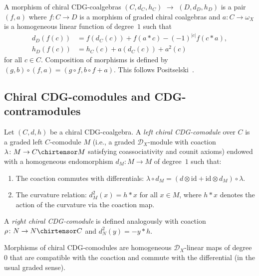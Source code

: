 \begin{remark}
\label{rem:CDG-morphisms}
A morphism of chiral CDG-coalgebras $(C, d_C, h_C)$
$\to$ $(D, d_D, h_D)$ is a pair $(f, a)$ where
$f\colon C \to D$ is a morphism of graded chiral
coalgebras and $a\colon C \to \omega_X$
is a homogeneous linear function of degree~$1$ such
that
\begin{align*}
d_D(f(c)) &= f(d_C(c)) + f(a \ast c) - (-1)^{|c|}f(c \ast a), \\
h_D(f(c)) &= h_C(c) + a(d_C(c)) + a^2(c)
\end{align*}
for all $c \in C$.
Composition of morphisms is defined by
$(g, b) \circ (f, a) = (g \circ f,\allowbreak b \circ f + a)$.
This follows Positselski~\cite[\S4.1]{Positselski11}.
\end{remark}

\subsection{Chiral CDG-comodules and CDG-contramodules}
\label{subsec:chiral-CDG-comod-contra}

\begin{definition}\label{def:chiral-CDG-comodule}
Let $(C, d, h)$ be a chiral CDG-coalgebra. A \emph{left chiral
CDG-comodule} over $C$ is a graded left $C$-comodule $M$
(i.e., a graded $\mathcal{D}_X$-module with coaction
$\lambda\colon M \to C \chirtensor M$ satisfying coassociativity
and counit axioms) endowed with a homogeneous endomorphism
$d_M\colon M \to M$ of degree~$1$ such that:
\begin{enumerate}
\item The coaction commutes with differentials:
 $\lambda \circ d_M = (d \otimes \mathrm{id} + \mathrm{id} \otimes d_M) \circ \lambda$.
\item The curvature relation:
 $d_M^2(x) = h \ast x$ for all $x \in M$,
 where $h \ast x$ denotes the action of the curvature
 via the coaction map.
\end{enumerate}

A \emph{right chiral CDG-comodule} is defined analogously with
coaction $\rho\colon N \to N \chirtensor C$ and
$d_N^2(y) = -y \ast h$.

Morphisms of chiral CDG-comodules are homogeneous $\mathcal{D}_X$-linear
maps of degree~$0$ that are compatible with the coaction
and commute with the differential (in the usual graded sense).
\end{definition}

